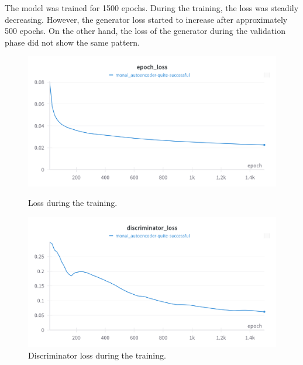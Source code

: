 The model was trained for 1500 epochs. During the training, the loss was steadily decreasing. However, the generator loss started to increase after approximately 500 epochs. On the other hand, the loss of the generator during the validation phase did not show the same pattern.

\begin{figure}[H]
\includegraphics[width=\linewidth]{detailed_engineering/Monai Autoencoder/charts/epoch_loss.png}
\caption{Loss during the training.}
\endminipage\hfill
{}
\includegraphics[width=\linewidth]{detailed_engineering/Monai Autoencoder/charts/discriminator_loss.png}
\caption{Discriminator loss during the training.}
\endminipage
\end{figure}

